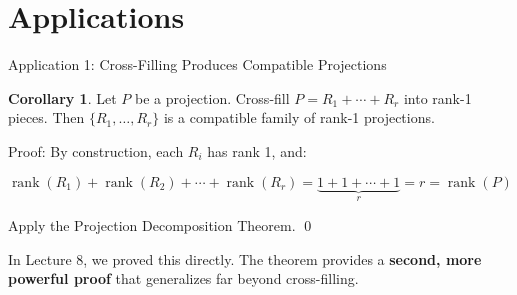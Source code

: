 \documentclass[10pt]{beamer}
\theoremstyle{definition}
\newtheorem{cor}{Corollary}[section]
\newcommand{\x}[1]{\alert{\textbf{#1}}}
\begin{document}
\section{Applications}

\begin{frame}{Application 1: Cross-Filling Produces Compatible Projections}

\begin{cor}
Let $P$ be a projection. Cross-fill $P = R_1 + \cdots + R_r$ into rank-1 pieces. Then $\{R_1, \ldots, R_r\}$ is a compatible family of rank-1 projections.
\end{cor}

\vspace{0.5em}

Proof: By construction, each $R_i$ has rank 1, and:

$$\operatorname{rank}(R_1) + \operatorname{rank}(R_2) + \cdots + \operatorname{rank}(R_r) = \underbrace{1 + 1 + \cdots + 1}_{r} = r = \operatorname{rank}(P)$$

Apply the Projection Decomposition Theorem. \qed

\vspace{0.5em}

In Lecture 8, we proved this directly. The theorem provides a \x{second, more powerful proof} that generalizes far beyond cross-filling.

\end{frame}
\end{document}
